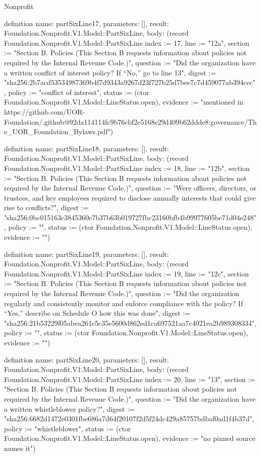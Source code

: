 \begin{lexlean}{Nonprofit}
\begin{semanticmodule}
definition{
  name: partSixLine17,
  parameters: [],
  result: Foundation.Nonprofit.V1.Model::PartSixLine,
  body: (record Foundation.Nonprofit.V1.Model::PartSixLine {index := 17, line := "12a", section := "Section B. Policies (This Section B requests information about policies not required by the Internal Revenue Code.)", question := "Did the organization have a written conflict of interest policy? If “No,” go to line 13", digest := "sha256:2b7acd53534987369b4f7d9343a9267d23f727b25d7bee7c7d459077ab394cec", policy := "conflict of interest", status := (ctor Foundation.Nonprofit.V1.Model::LineStatus.open), evidence := "mentioned in https://github.com/UOR-Foundation/.github@92da114114fc9b76cbf2c5168e29d409b62ddde8:governance/The_UOR_Foundation_Bylaws.pdf"})
}

definition{
  name: partSixLine18,
  parameters: [],
  result: Foundation.Nonprofit.V1.Model::PartSixLine,
  body: (record Foundation.Nonprofit.V1.Model::PartSixLine {index := 18, line := "12b", section := "Section B. Policies (This Section B requests information about policies not required by the Internal Revenue Code.)", question := "Were officers, directors, or trustees, and key employees required to disclose annually interests that could give rise to conflicts?", digest := "sha256:0bc015163c3845360e7b37b63b019727fbc23160bfb4b99977605be71d04e248", policy := "", status := (ctor Foundation.Nonprofit.V1.Model::LineStatus.open), evidence := ""})
}

definition{
  name: partSixLine19,
  parameters: [],
  result: Foundation.Nonprofit.V1.Model::PartSixLine,
  body: (record Foundation.Nonprofit.V1.Model::PartSixLine {index := 19, line := "12c", section := "Section B. Policies (This Section B requests information about policies not required by the Internal Revenue Code.)", question := "Did the organization regularly and consistently monitor and enforce compliance with the policy? If “Yes,” describe on Schedule O how this was done", digest := "sha256:21b53229f05abea261c5c35e5600d862ed1ca697521aa7c4021ea2b989308334", policy := "", status := (ctor Foundation.Nonprofit.V1.Model::LineStatus.open), evidence := ""})
}

definition{
  name: partSixLine20,
  parameters: [],
  result: Foundation.Nonprofit.V1.Model::PartSixLine,
  body: (record Foundation.Nonprofit.V1.Model::PartSixLine {index := 20, line := "13", section := "Section B. Policies (This Section B requests information about policies not required by the Internal Revenue Code.)", question := "Did the organization have a written whistleblower policy?", digest := "sha256:6682d1472e0301fbe686a7d64f20107f2d5f24dc429a85757bdbaf0ad1f4b37d", policy := "whistleblower", status := (ctor Foundation.Nonprofit.V1.Model::LineStatus.open), evidence := "no pinned source names it"})
}


\end{semanticmodule}
\end{lexlean}

